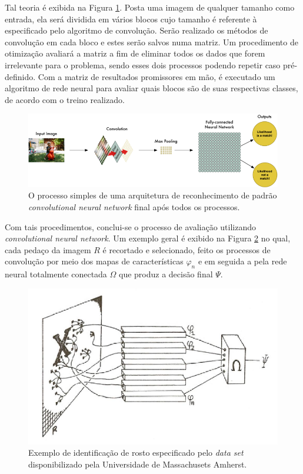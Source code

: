 \documentclass[10pt, conference]{IEEEtran}
\begin{document}
			
			Tal teoria é exibida na Figura \ref{fig:convolucao_teoria}. Posta uma imagem de qualquer tamanho como entrada, ela será dividida em vários blocos cujo tamanho é referente à especificado pelo algoritmo de convolução. Serão realizado os métodos de convolução em cada bloco e estes serão salvos numa matriz. Um procedimento de otimização avaliará a matriz a fim de eliminar todos os dados que forem irrelevante para o problema, sendo esses dois processos podendo repetir caso pré-definido. Com a matriz de resultados promissores em mão, é executado um algoritmo de rede neural para avaliar quais blocos são de suas respectivas classes, de acordo com o treino realizado.

			\begin{figure}[h]
				\centering
				\includegraphics[width=1.0\linewidth]{img/convolucao_teoria.png}
				\caption{O processo simples de uma arquitetura de reconhecimento de padrão \textit{convolutional neural network} final após todos os processos.}
				\label{fig:convolucao_teoria}
			\end{figure}

			Com tais procedimentos, conclui-se o processo de avaliação utilizando \textit{convolutional neural network}. Um exemplo geral é exibido na Figura \ref{fig:cnn_geral} no qual, cada pedaço da imagem $ R $ é recortado e selecionado, feito os processos de convolução por meio dos mapas de características $ \varphi_n $ e em seguida a pela rede neural totalmente conectada $ \Omega $ que produz a decisão final $ \varPsi $.
			
			\begin{figure}[b]
				\centering
				\includegraphics[width=0.9\linewidth]{img/single_layer_cnn.png}
				\caption{Exemplo de identificação de rosto especificado pelo \textit{data set} disponibilizado pela Universidade de Massachusets Amherst.}
				\label{fig:cnn_geral}
			\end{figure}
\end{document}
